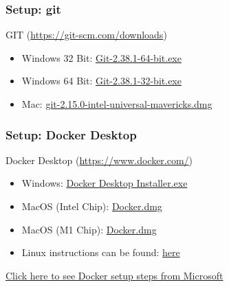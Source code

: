 \documentclass[aspectratio=169]{beamer}
\begin{document}
\begin{frame}
	\frametitle{Setup: git}
	GIT (\href{https://git-scm.com/downloads}{https://git-scm.com/downloads})
	\begin{itemize}
		\item Windows 32 Bit: \href{https://prereqs.codemash.org/Files/Git-2.38.1-64-bit.exe}{Git-2.38.1-64-bit.exe}
		\item Windows 64 Bit: \href{https://prereqs.codemash.org/Files/Git-2.38.1-32-bit.exe}{Git-2.38.1-32-bit.exe}
		\item Mac: \href{https://prereqs.codemash.org/Files/git-2.15.0-intel-universal-mavericks.dmg}{git-2.15.0-intel-universal-mavericks.dmg}
	\end{itemize}
\end{frame}

\begin{frame}
	\frametitle{Setup: Docker Desktop}
	Docker Desktop (\href{https://www.docker.com/}{https://www.docker.com/})

	\begin{itemize}
		\item Windows: \href{https://prereqs.codemash.org/Files/Docker\%20Desktop\%20Installer.exe}{Docker Desktop Installer.exe}
		\item MacOS (Intel Chip): \href{https://prereqs.codemash.org/Files/Docker.dmg}{Docker.dmg}
		\item MacOS (M1 Chip): \href{https://prereqs.codemash.org/Files/Chip/Docker.dmg}{Docker.dmg}
		\item Linux instructions can be found: \href{https://docs.docker.com/desktop/install/linux-install/}{here}
	\end{itemize}
	\vspace{2mm}

	\href{https://code.visualstudio.com/docs/devcontainers/containers\#\_installation}{Click here to see Docker setup steps from Microsoft}
\end{frame}
\end{document}

